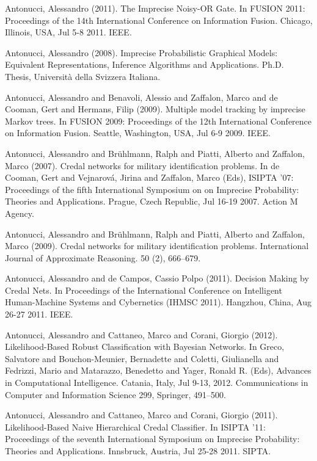 \begin{cventries}
\begin{cvitems}
\item Antonucci, Alessandro (2011).   The Imprecise Noisy-OR Gate.   In FUSION 2011: Proceedings of the 14th International Conference on Information Fusion.   Chicago, Illinois, USA,   Jul 5-8 2011.   IEEE.
\item Antonucci, Alessandro (2008).   Imprecise Probabilistic Graphical Models: Equivalent Representations, Inference Algorithms and Applications.   Ph.D. Thesis, Università della Svizzera Italiana.
\item Antonucci, Alessandro and Benavoli, Alessio and Zaffalon, Marco and de Cooman, Gert and Hermans, Filip (2009).   Multiple model tracking by imprecise Markov trees.   In FUSION 2009: Proceedings of the 12th International Conference on Information Fusion.   Seattle, Washington, USA,   Jul 6-9 2009.   IEEE.
\item Antonucci, Alessandro and Brühlmann, Ralph and Piatti, Alberto and Zaffalon, Marco (2007).   Credal networks for military identification problems.   In de Cooman, Gert and Vejnarová, Jirina and Zaffalon, Marco (Eds), ISIPTA ’07: Proceedings of the fifth International Symposium on on Imprecise Probability: Theories and Applications.   Prague, Czech Republic,   Jul 16-19 2007.   Action M Agency.
\item Antonucci, Alessandro and Brühlmann, Ralph and Piatti, Alberto and Zaffalon, Marco (2009).   Credal networks for military identification problems.   International Journal of Approximate Reasoning. 50 (2), 666–679.
\item Antonucci, Alessandro and de Campos, Cassio Polpo (2011).   Decision Making by Credal Nets.   In Proceedings of the International Conference on Intelligent Human-Machine Systems and Cybernetics (IHMSC 2011).   Hangzhou, China,   Aug 26-27 2011.   IEEE.
\item Antonucci, Alessandro and Cattaneo, Marco and Corani, Giorgio (2012).   Likelihood-Based Robust Classification with Bayesian Networks.   In Greco, Salvatore and Bouchon-Meunier, Bernadette and Coletti, Giulianella and Fedrizzi, Mario and Matarazzo, Benedetto and Yager, Ronald R. (Eds), Advances in Computational Intelligence.   Catania, Italy, Jul 9-13, 2012.   Communications in Computer and Information Science 299, Springer, 491–500.
\item Antonucci, Alessandro and Cattaneo, Marco and Corani, Giorgio (2011).   Likelihood-Based Naive Hierarchical Credal Classifier.   In ISIPTA ’11: Proceedings of the seventh International Symposium on Imprecise Probability: Theories and Applications.   Innsbruck, Austria,   Jul 25-28 2011.   SIPTA.

\end{cvitems}
\end{cventries}
